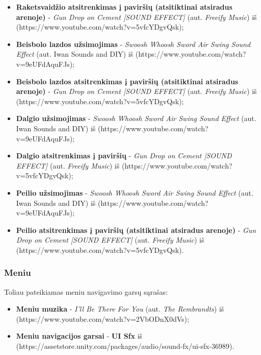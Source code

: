 \documentclass{VUMIFPSkursinis}
\begin{document}
\begin{itemize}
    \item \textbf{Raketsvaidžio atsitrenkimas į paviršių (atsitiktinai atsiradus arenoje)} - \textit{Gun Drop on Cement [SOUND EFFECT]} (aut. \textit{Freeify Music}) iš (https://www.youtube.com/watch?v=5vfcYDgvQsk);
    \item \textbf{Beisbolo lazdos užsimojimas} - \textit{Swoosh Whoosh Sword Air Swing Sound Effect} (aut. Iwan Sounds and DIY) iš (https://www.youtube.com/watch?v=9eUFdAquFJs);
    \item \textbf{Beisbolo lazdos atsitrenkimas į paviršių (atsitiktinai atsiradus arenoje)} - \textit{Gun Drop on Cement [SOUND EFFECT]} (aut. \textit{Freeify Music}) iš (https://www.youtube.com/watch?v=5vfcYDgvQsk);
    \item \textbf{Dalgio užsimojimas} - \textit{Swoosh Whoosh Sword Air Swing Sound Effect} (aut. Iwan Sounds and DIY) iš (https://www.youtube.com/watch?v=9eUFdAquFJs);
    \item \textbf{Dalgio atsitrenkimas į paviršių } - \textit{Gun Drop on Cement [SOUND EFFECT]} (aut. \textit{Freeify Music}) iš (https://www.youtube.com/watch?v=5vfcYDgvQsk);
    \item \textbf{Peilio užsimojimas} - \textit{Swoosh Whoosh Sword Air Swing Sound Effect} (aut. Iwan Sounds and DIY) iš (https://www.youtube.com/watch?v=9eUFdAquFJs);
    \item \textbf{Peilio atsitrenkimas į paviršių (atsitiktinai atsiradus arenoje)} - \textit{Gun Drop on Cement [SOUND EFFECT]} (aut. \textit{Freeify Music}) iš (https://www.youtube.com/watch?v=5vfcYDgvQsk).
\end{itemize}


\subsubsection{Meniu}
Toliau pateikiamas meniu navigavimo garsų sąrašas:
\begin{itemize}
    \item \textbf{Meniu muzika} - \textit{I'll Be There For You} (aut. \textit{The Rembrandts}) iš (https://www.youtube.com/watch?v=2VbODnX0dVs);
    \item \textbf{Meniu navigacijos garsai} - \textbf{UI Sfx} iš (https://assetstore.unity.com/packages/audio/sound-fx/ui-sfx-36989).
\end{itemize}
\end{document}
